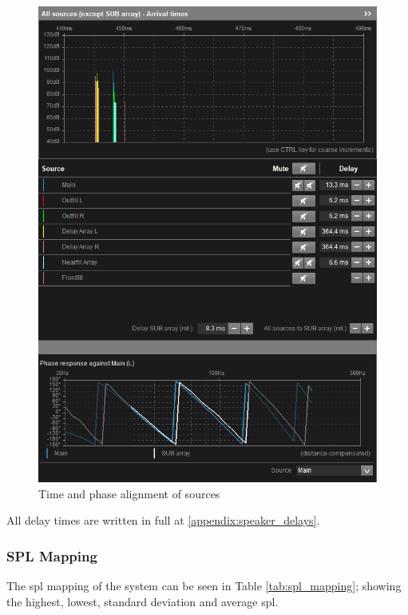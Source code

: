         \begin{figure}[H]
            \centering
            \includegraphics{Images/delay_alignment.png}
            \caption{Time and phase alignment of sources}
            \label{fig:delay_alignment}
        \end{figure}

        All delay times are written in full at \ref{appendix:speaker_delays}.
        
    \subsubsection{SPL Mapping}
     The \gls{spl} mapping of the system can be seen in Table \ref{tab:spl_mapping}; showing the highest, lowest, standard deviation and average \gls{spl}.
     
